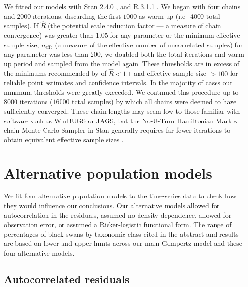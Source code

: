 We fitted our models with Stan 2.4.0 \citep{stan-manual2014}, and R 3.1.1
\citep{r2014}. We began with four chains and $2000$ iterations, discarding the
first $1000$ as warm up (i.e.~4000 total samples). If $\hat{R}$ (the potential
scale reduction factor --- a measure of chain convergence) was greater than
$1.05$ for any parameter or the minimum effective sample size,
$n_\mathrm{eff}$, (a measure of the effective number of uncorrelated samples)
for any parameter was less than $200$, we doubled both the total iterations
and warm up period and sampled from the model again. These thresholds are in
excess of the minimums recommended by \citet{gelman2006a} of $\hat{R} < 1.1$
and effective sample size $> 100$ for reliable point estimates and confidence
intervals. In the majority of cases our minimum thresholds were greatly
exceeded. We continued this procedure up to $8000$ iterations ($16000$ total
samples) by which all chains were deemed to have sufficiently converged. These
chain lengths may seem low to those familiar with software such as WinBUGS or
JAGS, but the No-U-Turn Hamiltonian Markov chain Monte Carlo Sampler in Stan
generally requires far fewer iterations to obtain equivalent effective sample
sizes \citep{stan-manual2014}.


\section{Alternative population models}

We fit four alternative population models to the time-series data to check how
they would influence our conclusions. Our alternative models allowed for
autocorrelation in the residuals, assumed no density dependence, allowed for
observation error, or assumed a Ricker-logistic functional form. The range of
percentages of black swans by taxonomic class cited in the abstract and results
are based on lower and upper limits across our main Gompertz model and these
four alternative models.

\subsection{Autocorrelated residuals}

